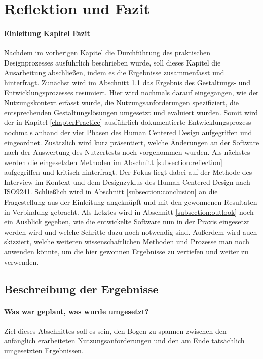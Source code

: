 \chapter{Reflektion und Fazit}
\subsubsection{Einleitung Kapitel Fazit}

Nachdem im vorherigen Kapitel die Durchführung des praktischen Designprozesses
ausführlich beschrieben wurde, soll dieses Kapitel die Ausarbeitung
abschließen, indem es die Ergebnisse zusammenfasst und hinterfragt. Zunächst
wird im Abschnitt \ref{subsection:resultDescription} das Ergebnis des
Gestaltungs- und Entwicklungsprozesses resümiert. Hier wird nochmals darauf
eingegangen, wie der Nutzungskontext erfasst wurde, die Nutzungsanforderungen
spezifiziert, die entsprechenden Gestaltungslösungen umgesetzt und evaluiert
wurden. Somit wird der in Kapitel \ref{chapterPractice} ausführlich
dokumentierte Entwicklungsprozess nochmals anhand der vier Phasen des Human
Centered Design aufgegriffen und eingeordnet\cite{iso9241}. Zusätzlich wird
kurz präsentiert, welche Änderungen an der Software nach der Auswertung des
Nutzertests noch vorgenommen wurden. Als nächstes werden die eingesetzten
Methoden im Abschnitt \ref{subsection:reflection} aufgegriffen und kritisch
hinterfragt. Der Fokus liegt dabei auf der Methode des Interview im Kontext und
dem Designzyklus des Human Centered Design nach ISO9241. Schließlich wird in
Abschnitt \ref{subsection:conclusion} an die Fragestellung aus der Einleitung
angeknüpft und mit den gewonnenen Resultaten in Verbindung gebracht. Als
Letztes wird in Abschnitt \ref{subsection:outlook} noch ein Ausblick gegeben,
wie die entwickelte Software nun in der Praxis eingesetzt werden wird und
welche Schritte dazu noch notwendig sind. Außerdem wird auch skizziert, welche
weiteren wissenschaftlichen Methoden und Prozesse man noch anwenden könnte, um
die hier gewonnen Ergebnisse zu vertiefen und weiter zu verwenden.

\section{Beschreibung der Ergebnisse}
\label{subsection:resultDescription}

\subsubsection{Was war geplant, was wurde umgesetzt?}
Ziel dieses Abschnittes soll es sein, den Bogen zu spannen zwischen den
anfänglich erarbeiteten Nutzungsanforderungen und den am Ende tatsächlich
umgesetzten Ergebnissen.

